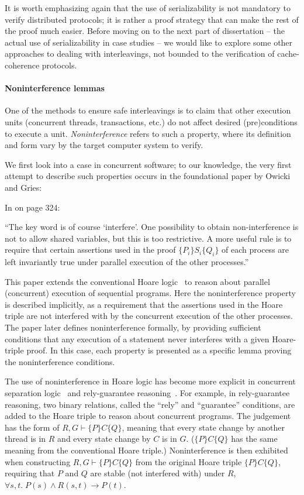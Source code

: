 It is worth emphasizing again that the use of serializability is not mandatory to verify distributed protocols; it is rather a proof strategy that can make the rest of the proof much easier.
Before moving on to the next part of dissertation -- the actual use of serializability in case studies -- we would like to explore some other approaches to dealing with interleavings, not bounded to the verification of cache-coherence protocols.

\paragraph{Noninterference lemmas}

One of the methods to ensure safe interleavings is to claim that other execution units (concurrent threads, transactions, etc.) do not affect desired (pre)conditions to execute a unit.
\emph{Noninterference} refers to such a property, where its definition and form vary by the target computer system to verify.

We first look into a case in concurrent software; to our knowledge, the very first attempt to describe such properties occurs in the foundational paper by Owicki and Gries:
\begin{displayquote}
  In \cite{Owicki:1976} on page 324:

  ``The key word is of course `interfere'.
  One possibility to obtain non-interference is not to allow shared variables, but this is too restrictive.
  A more useful rule is to require that certain assertions used in the proof $\{P_i\} S_i \{Q_i\}$ of each process are left invariantly true under parallel execution of the other processes.''
\end{displayquote}
This paper extends the conventional Hoare logic~\cite{Hoare} to reason about parallel (concurrent) execution of sequential programs.
Here the noninterference property is described implicitly, as a requirement that the assertions used in the Hoare triple are not interfered with by the concurrent execution of the other processes.
The paper later defines noninterference formally, by providing sufficient conditions that any execution of a statement never interferes with a given Hoare-triple proof.
In this case, each property is presented as a specific lemma proving the noninterference conditions.

The use of noninterference in Hoare logic has become more explicit in concurrent separation logic~\cite{OHearn:2004} and rely-guarantee reasoning~\cite{Jones:1983}.
For example, in rely-guarantee reasoning, two binary relations, called the ``rely'' and ``guarantee'' conditions, are added to the Hoare triple to reason about concurrent programs.
The judgement has the form of $R,G \vdash \{P\}C\{Q\}$, meaning that every state change by another thread is in $R$ and every state change by $C$ is in $G$.
($\{P\}C\{Q\}$ has the same meaning from the conventional Hoare triple.)
Noninterference is then exhibited when constructing $R,G \vdash \{P\}C\{Q\}$ from the original Hoare triple $\{P\}C\{Q\}$, requiring that $P$ and $Q$ are stable (not interfered with) under $R$, \ie{} $\forall s, t.\; P(s) \wedge R(s, t) \to P(t)$.

